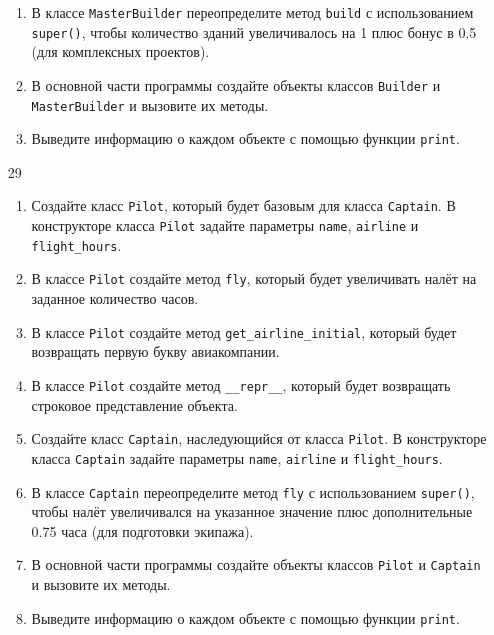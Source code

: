 \begin{enumerate}
\begin{enumerate}
    \item В классе \texttt{MasterBuilder} переопределите метод \texttt{build} с использованием \texttt{super()}, чтобы количество зданий увеличивалось на 1 плюс бонус в 0.5 (для комплексных проектов).
    
    \item В основной части программы создайте объекты классов \texttt{Builder} и \texttt{MasterBuilder} и вызовите их методы.
    
    \item Выведите информацию о каждом объекте с помощью функции \texttt{print}.
\end{enumerate}

\item[29] 
\begin{enumerate}
    \item Создайте класс \texttt{Pilot}, который будет базовым для класса \texttt{Captain}. В конструкторе класса \texttt{Pilot} задайте параметры \texttt{name}, \texttt{airline} и \texttt{flight\_hours}.
    
    \item В классе \texttt{Pilot} создайте метод \texttt{fly}, который будет увеличивать налёт на заданное количество часов.
    
    \item В классе \texttt{Pilot} создайте метод \texttt{get\_airline\_initial}, который будет возвращать первую букву авиакомпании.
    
    \item В классе \texttt{Pilot} создайте метод \texttt{\_\_repr\_\_}, который будет возвращать строковое представление объекта.
    
    \item Создайте класс \texttt{Captain}, наследующийся от класса \texttt{Pilot}. В конструкторе класса \texttt{Captain} задайте параметры \texttt{name}, \texttt{airline} и \texttt{flight\_hours}.
    
    \item В классе \texttt{Captain} переопределите метод \texttt{fly} с использованием \texttt{super()}, чтобы налёт увеличивался на указанное значение плюс дополнительные 0.75 часа (для подготовки экипажа).
    
    \item В основной части программы создайте объекты классов \texttt{Pilot} и \texttt{Captain} и вызовите их методы.
    
    \item Выведите информацию о каждом объекте с помощью функции \texttt{print}.
\end{enumerate}


\end{enumerate}

